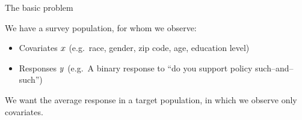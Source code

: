 
\begin{frame}{The basic problem}


We have a survey population, for whom we observe:
%
\begin{itemize}
 \item Covariates $x$ (e.g.~race, gender, zip code, age, education level)
 \item Responses $y$ (e.g.~A binary response to ``do you support policy such--and--such'')
\end{itemize}
%

We want the average response in a target population,
in which we observe only covariates.




\end{frame}
